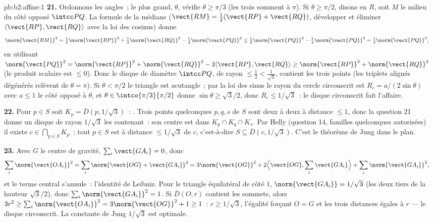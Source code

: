 \begin{solution}{pb:b2:affine:1}
\textbf{21.} Ordonnons les angles~; le plus grand, $\theta$,
vérifie $\theta \geq \pi/3$ (les trois somment à $\pi$). Si
$\theta \geq \pi/2$, disons en $R$, soit $M$ le milieu du
côté opposé $\intcc PQ$. La formule de la médiane ($\vect{RM}
= \tfrac12(\vect{RP} + \vect{RQ})$, développer et éliminer
$\langle\vect{RP}, \vect{RQ}\rangle$ avec la loi des cosinus) donne
\[
\norm{\vect{RM}}^2 = \tfrac12\norm{\vect{RP}}^2 +
\tfrac12\norm{\vect{RQ}}^2 - \tfrac14\norm{\vect{PQ}}^2 \leq
\tfrac12\norm{\vect{PQ}}^2 - \tfrac14\norm{\vect{PQ}}^2 =
\tfrac14\norm{\vect{PQ}}^2,
\]
en utilisant $\norm{\vect{PQ}}^2 = \norm{\vect{RP}}^2 +
\norm{\vect{RQ}}^2 - 2\langle\vect{RP}, \vect{RQ}\rangle \geq
\norm{\vect{RP}}^2 + \norm{\vect{RQ}}^2$ (le produit scalaire
est $\leq 0$). Donc le disque de diamètre $\intcc PQ$, de rayon
$\leq \tfrac12 < \tfrac1{\sqrt3}$, contient les trois points
(les triplets alignés dégénérés relèvent de $\theta = \pi$). Si
$\theta < \pi/2$ le triangle est acutangle~; par la loi des sinus
le rayon du cercle circonscrit est $R_c = a/(2\sin\theta)$ avec $a \leq 1$
le côté opposé à $\theta$, et $\theta \in
\intco{\pi/3}{\pi/2}$ donne $\sin\theta \geq \sqrt3/2$, donc
$R_c \leq 1/\sqrt3$~: le disque circonscrit fait l'affaire.

\textbf{22.} Pour $p \in S$ soit $K_p = \overline D(p,
1/\sqrt3)$~:  . Trois points quelconques $p, q, s$ de $S$
sont deux à deux à distance $\leq 1$, donc la question 21 donne un
disque de rayon $1/\sqrt3$ les contenant~: son centre est dans
$K_p \cap K_q \cap K_s$. Par Helly  (question 14,
familles quelconques autorisées) il existe $c \in \bigcap_{p\in
S}K_p$~: tout $p \in S$ est à distance $\leq 1/\sqrt3$ de $c$,
c'est-à-dire $S \subseteq \overline D(c, 1/\sqrt3)$. C'est le théorème
de Jung dans le plan.

\textbf{23.} Avec $G$ le centre de gravité, $\sum_i\vect{GA_i} = 0$,
donc
\[
\sum_i\norm{\vect{OA_i}}^2 = \sum_i\norm{\vect{OG} +
\vect{GA_i}}^2 = 3\norm{\vect{OG}}^2 + 2\Bigl\langle
\vect{OG}, \sum_i\vect{GA_i}\Bigr\rangle +
\sum_i\norm{\vect{GA_i}}^2,
\]
et le terme central s'annule~: l'identité de Leibniz. Pour le
triangle équilatéral de côté $1$, $\norm{\vect{GA_i}} =
1/\sqrt3$ (les deux tiers de la hauteur $\sqrt3/2$), donc
$\sum_i\norm{\vect{GA_i}}^2 = 1$. Si $\overline D(O, r)$
contient les sommets, alors $3r^2 \geq
\sum_i\norm{\vect{OA_i}}^2 = 3\norm{\vect{OG}}^2 + 1 \geq 1$~:
$r \geq 1/\sqrt3$, l'égalité forçant $O = G$ et les trois
distances égales à $r$ --- le disque circonscrit. La constante de
Jung $1/\sqrt3$ est optimale.


\end{solution}

